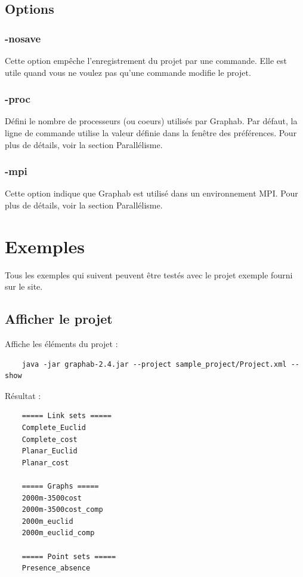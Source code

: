 \documentclass[a4paper,10pt]{report}
\begin{document}
\section{Options}
\subsection{-nosave}
Cette option empêche l'enregistrement du projet par une commande.
Elle est utile quand vous ne voulez pas qu'une commande modifie le projet.

\subsection{-proc}
Défini le nombre de processeurs (ou coeurs) utilisés par Graphab.
Par défaut, la ligne de commande utilise la valeur définie dans la fenêtre des préférences.
Pour plus de détails, voir la section Parallélisme.

\subsection{-mpi}
Cette option indique que Graphab est utilisé dans un environnement MPI. Pour plus de détails, voir la section Parallélisme.


\chapter{Exemples}
Tous les exemples qui suivent peuvent être testés avec le projet exemple fourni sur le site.

\section{Afficher le projet}
Affiche les éléments du projet :
\begin{Verbatim}
	java -jar graphab-2.4.jar --project sample_project/Project.xml --show
\end{Verbatim}
Résultat :
\begin{Verbatim}
	===== Link sets =====
	Complete_Euclid
	Complete_cost
	Planar_Euclid
	Planar_cost
	
	===== Graphs =====
	2000m-3500cost
	2000m-3500cost_comp
	2000m_euclid
	2000m_euclid_comp
	
	===== Point sets =====
	Presence_absence
\end{Verbatim}
\end{document}
